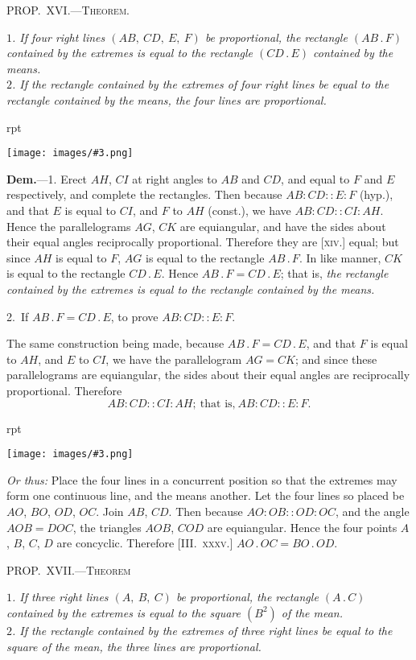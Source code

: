 \documentclass[oneside]{book}
\newcounter{wrapwidth}
\newcommand\mypropl[2]{
\bigskip\Needspace*{4\baselineskip}\begin{center}\textsc{#1}\end{center}
\hspace{\parindent}\emph{#2}\par\medskip
}
\newcommand\imgflow[3]{
\setcounter{wrapwidth}{#1}
\begin{wrapfigure}[#2]{r}{\value{wrapwidth}pt}
\begin{center}
\vspace{-0.3in}
\texttt{[image: images/\#3.png]}
\end{center}
\end{wrapfigure}
}
\begin{document}
\mypropl{PROP\@.~XVI\@.---Theorem.}{$1$. If four right lines $(AB,\ CD,\ E,\ F)$ be proportional,
the rectangle $(AB\,.\,F)$ contained by the extremes is equal
to the rectangle $(CD\,.\,E)$ contained by the means.\\
\indent $2$. If the rectangle contained by the extremes of four
right lines be equal to the rectangle contained by the
means, the four lines are proportional.}

\imgflow{175}{9}{f187}

\textbf{Dem.}---1. Erect $AH$, $CI$ at right angles to $AB$ and
$CD$, and equal to $F$
and $E$ respectively,
and complete the rectangles.
Then because
$AB : CD :: E : F$
(hyp.), and that $E$ is
equal to $CI$, and $F$ to
$AH$ (const.), we have
$AB : CD:: CI : AH$.
Hence the parallelograms $AG$, $CK$ are equiangular, and
have the sides about their equal angles reciprocally
proportional. Therefore they are [\textsc{xiv.}] equal; but
since $AH$ is equal to $F$, $AG$ is equal to the rectangle
$AB\,.\,F$. In like manner, $CK$ is equal to the rectangle
$CD\,.\,E$. Hence $AB\,.\,F = CD\,.\,E$; that is, \emph{the rectangle
contained by the extremes is equal to the rectangle contained
by the means.}

2.~If $AB\,.\,F = CD\,.\,E$, to prove $AB :CD :: E : F$.

The same construction being made, because $AB\,.\,F
= CD\,.\,E$, and that $F$ is equal to $AH$, and $E$ to $CI$, we
have the parallelogram $AG = CK$; and since these parallelograms
are equiangular, the sides about their equal
angles are reciprocally proportional. Therefore
\[
AB : CD :: CI : AH;\ \text{that is,}\ AB : CD :: E : F.
\]

\imgflow{100}{7}{f188}

\begin{footnotesize}
\emph{Or thus:} Place the four lines in a concurrent
position so that the extremes may
form one continuous line, and the means
another. Let the four lines so placed be
$AO$, $BO$, $OD$, $OC$. Join $AB$, $CD$. Then
because $AO : OB :: OD : OC$, and the
angle $AOB = DOC$, the triangles $AOB$,
$COD$ are equiangular. Hence the four
points $A$, $B$, $C$, $D$ are concyclic. Therefore
[III\@.~\textsc{xxxv.}] $AO\,.\,OC = BO\,.\,OD$.
\par\end{footnotesize}

\mypropl{PROP\@.~XVII\@.---Theorem}{$1$. %
If three right lines $(A,\ B,\ C)$ be proportional, the
rectangle $(A\,.\,C)$ contained by the extremes is equal to the
square $(B^{2})$ of the mean.\\
\indent $2$. If the rectangle contained by the extremes of three
right lines be equal to the square of the mean, the three
lines are proportional.}
\end{document}
